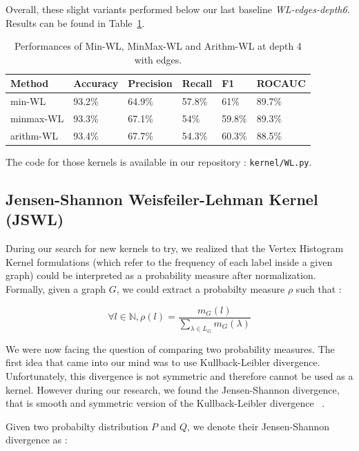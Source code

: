 \documentclass{IEEEtran}
\begin{document}
Overall, these slight variants performed below our last baseline \emph{WL-edges-depth6}.
Results can be found in Table~\ref{tab:method_comparison_depth4}.
\begin{table}[h]
    \centering
    \begin{tabular}{l|llll|l}
        Method    & Accuracy & Precision & Recall & F1     & ROCAUC \\
        \hline
        min-WL    & 93.2\%   & 64.9\%    & 57.8\% & 61\%   & 89.7\% \\
        minmax-WL & 93.3\%   & 67.1\%    & 54\%   & 59.8\% & 89.3\% \\
        arithm-WL & 93.4\%   & 67.7\%    & 54.3\% & 60.3\% & 88.5\% \\
    \end{tabular}
    \caption{Performances of Min-WL, MinMax-WL and Arithm-WL at depth 4 with edges.}
    \label{tab:method_comparison_depth4}
\end{table}

The code for those kernels is available in our repository : \texttt{kernel/WL.py}.

\subsection{Jensen-Shannon Weisfeiler-Lehman Kernel (JSWL)}

During our search for new kernels to try, we realized that the Vertex Histogram Kernel formulations (which refer to the frequency of each label inside a given graph) could be interpreted as a probability measure after normalization.
Formally, given a graph $G$, we could extract a probabilty measure
$\rho$ such that :

\begin{equation*}
    \forall l \in \mathbb N, \rho (l) = \frac{m_G(l)}{\sum_{\lambda \in L_G}{m_G(\lambda)}}
\end{equation*}

We were now facing the question of comparing two probability measures.
The first idea that came into our mind was to use Kullback-Leibler divergence.
Unfortunately, this divergence is not symmetric and therefore cannot be used as a kernel.
However during our research, we found the Jensen-Shannon divergence,
that is smooth and symmetric version of the Kullback-Leibler divergence ~\cite{callut2011sequence}.

Given two probabilty distribution $P$ and $Q$, we denote their
Jensen-Shannon divergence as :
\end{document}
